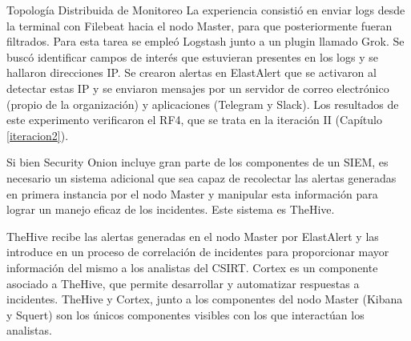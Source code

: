 \begin{subsection}{Topología Distribuida de Monitoreo}
    La experiencia consistió en enviar logs desde la terminal con Filebeat hacia el nodo Master, para que posteriormente fueran filtrados. Para esta tarea se empleó Logstash junto a un plugin llamado Grok. Se buscó identificar campos de interés que estuvieran presentes en los logs y se hallaron direcciones IP. Se crearon alertas en ElastAlert que se activaron al detectar estas IP y se enviaron mensajes por un servidor de correo electrónico (propio de la organización) y aplicaciones (Telegram y Slack). Los resultados de este experimento verificaron el RF4, que se trata en la iteración II (Capítulo \ref{iteracion2}). \par
    Si bien Security Onion incluye gran parte de los componentes de un SIEM, es necesario un sistema adicional que sea capaz de recolectar las alertas generadas en primera instancia por el nodo Master y manipular esta información para lograr un manejo eficaz de los incidentes. Este sistema es TheHive. \par
    TheHive recibe las alertas generadas en el nodo Master por ElastAlert y las introduce en un proceso de correlación de incidentes para proporcionar mayor información del mismo a los analistas del CSIRT. Cortex es un componente asociado a TheHive, que permite desarrollar y automatizar respuestas a incidentes. TheHive y Cortex, junto a los componentes del nodo Master (Kibana y Squert) son los únicos componentes visibles con los que interactúan los analistas. \par
    

\end{subsection}
